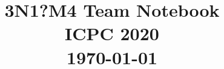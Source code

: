 \documentclass[10pt]{article}
\title{\vspace{-4ex}\Large{ \textbf{3N1?M4 Team Notebook} \\ ICPC 2020 \\ \today}}
\author{}
\date{}
\begin{document}
\begin{landscape}
\maketitle
\begin{multicols}{2}

\vspace{-8ex}
\tableofcontents
\newpage
\pagestyle{fancy}



\end{multicols}
\end{landscape}
\end{document}
